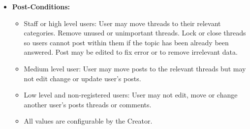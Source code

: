 \documentclass[11pt]{article}
\begin{document}
\begin{enumerate}
\begin{itemize}
	\item\textbf{Post-Conditions: }
	\begin{itemize}
		\item Staff or high level users:
		User may move threads to their relevant categories. Remove unused or unimportant threads. Lock or close threads so users cannot post within them if the topic has been already been answered. Post may be edited to fix error or to remove irrelevant data.
		\item Medium level user:
		User may move posts to the relevant threads but may not edit change or update user’s posts.
		\item Low level and non-registered users:
		User may not edit, move or change another user’s posts threads or comments.
	 	\item All values are configurable by the Creator.
	\end{itemize}


\end{itemize}
\end{enumerate}
\end{document}
